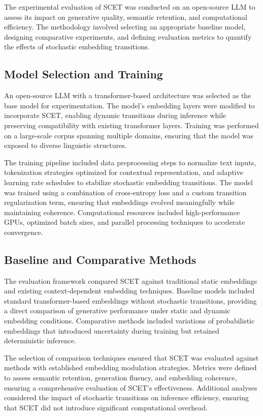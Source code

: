 \documentclass{article}
\begin{document}
The experimental evaluation of SCET was conducted on an open-source LLM to assess its impact on generative quality, semantic retention, and computational efficiency. The methodology involved selecting an appropriate baseline model, designing comparative experiments, and defining evaluation metrics to quantify the effects of stochastic embedding transitions.

\subsection{Model Selection and Training}

An open-source LLM with a transformer-based architecture was selected as the base model for experimentation. The model's embedding layers were modified to incorporate SCET, enabling dynamic transitions during inference while preserving compatibility with existing transformer layers. Training was performed on a large-scale corpus spanning multiple domains, ensuring that the model was exposed to diverse linguistic structures.

The training pipeline included data preprocessing steps to normalize text inputs, tokenization strategies optimized for contextual representation, and adaptive learning rate schedules to stabilize stochastic embedding transitions. The model was trained using a combination of cross-entropy loss and a custom transition regularization term, ensuring that embeddings evolved meaningfully while maintaining coherence. Computational resources included high-performance GPUs, optimized batch sizes, and parallel processing techniques to accelerate convergence.

\subsection{Baseline and Comparative Methods}

The evaluation framework compared SCET against traditional static embeddings and existing context-dependent embedding techniques. Baseline models included standard transformer-based embeddings without stochastic transitions, providing a direct comparison of generative performance under static and dynamic embedding conditions. Comparative methods included variations of probabilistic embeddings that introduced uncertainty during training but retained deterministic inference.

The selection of comparison techniques ensured that SCET was evaluated against methods with established embedding modulation strategies. Metrics were defined to assess semantic retention, generation fluency, and embedding coherence, ensuring a comprehensive evaluation of SCET's effectiveness. Additional analyses considered the impact of stochastic transitions on inference efficiency, ensuring that SCET did not introduce significant computational overhead.
\end{document}
